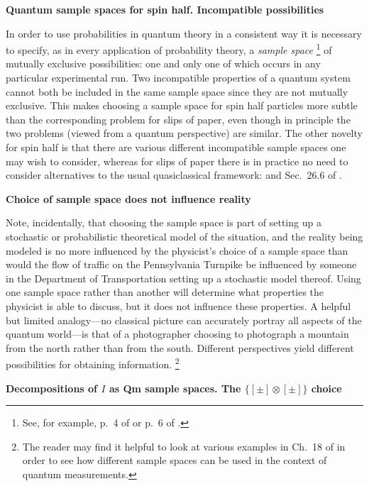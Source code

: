 \documentclass[12pt]{article} %
\def\outl#1{\par{\medskip\noindent\hspace*{.5cm}\bf
      \mathversion{bold}#1\mathversion{normal}\smallskip} }
\def\np{} \def\xa{} \def\xb{} \def\xn{} \def\xp{}
\def\outl#1{} \def\np{} \def\xa{} \def\xb{} \def\xn{} \def\xp{}
\def\outl#1{\par{\medskip\noindent\hspace*{.5cm}\bf
      \mathversion{bold}#1\mathversion{normal}\smallskip} }
\def\np{\newpage }\def\xn{\nopagebreak }\def\xp{\pagebreak }
\newcommand{\ot}{\otimes }
\begin{document}
\xb
\outl{Quantum sample spaces for spin half.  Incompatible possibilities}
\xa



In order to use probabilities in quantum theory in a consistent way it is
necessary to specify, as in every application of probability theory, a
\emph{sample space}%
\footnote{See, for example, p.~4 of \cite{Fllr68} or p.~6 of \cite{DGSc02}.} %
of mutually exclusive possibilities: one and only one of which occurs in any
particular experimental run.  Two incompatible properties of a quantum system
cannot both be included in the same sample space since they are not mutually
exclusive.  This makes choosing a sample space for spin half particles more
subtle than the corresponding problem for slips of paper, even though in
principle the two problems (viewed from a quantum perspective) are similar.
The other novelty for spin half is that there are various different
incompatible sample spaces one may wish to consider, whereas for slips of
paper there is in practice no need to consider alternatives to the usual
quasiclassical framework:
%
\cite{GMHr90,GMHr93,GMHr07} and Sec.~26.6 of \cite{Grff02c}.  

\xb
\outl{Choice of sample space does not influence reality}
\xa

Note, incidentally, that choosing the sample space is part of setting up a
stochastic or probabilistic theoretical model of the situation, and the
reality being modeled is no more influenced by the physicist's choice of a
sample space than would the flow of traffic on the Pennsylvania Turnpike be
influenced by someone in the Department of Transportation setting up a
stochastic model thereof.  Using one sample space rather than another will
determine what properties the physicist is able to discuss, but it does not
influence these properties. A helpful but limited analogy---no classical
picture can accurately portray all aspects of the quantum world---is that of a
photographer choosing to photograph a mountain from the north rather than from
the south.  Different perspectives yield different possibilities for obtaining
information.%
\footnote{The reader may find it helpful to look at various examples in Ch.~18
  of \cite{Grff02c} in order to see how different sample spaces can be used
  in the context of quantum measurements.} %

 \xb 
\outl{Decompositions of $I$ as Qm sample spaces.  The $\{[\pm]\ot[\pm]\}$
  choice} 
\xa
\end{document}
